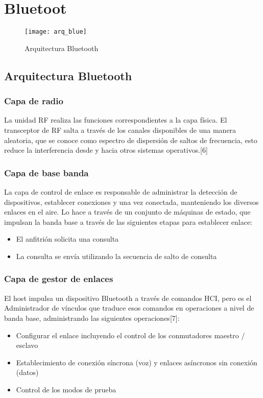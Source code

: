 \chapter{Bluetoot}

\begin{figure}[h]
    \centering
    \texttt{[image: arq\_blue]}
    \caption{Arquitectura Bluetooth}
\end{figure}

\section{Arquitectura Bluetooth}

\subsection{Capa de radio}
La unidad RF realiza las funciones correspondientes a la capa física. El transceptor de RF salta a través de los canales disponibles de una manera aleatoria, que se conoce como espectro de dispersión de saltos de frecuencia, esto reduce la interferencia desde y hacia otros sistemas operativos.[6]

\subsection{Capa de base banda}
La capa de control de enlace es responsable de administrar la detección de dispositivos, establecer conexiones y una vez conectada, manteniendo los diversos enlaces en el aire. Lo hace a través de un conjunto de máquinas de estado, que impulsan la banda base a través de las siguientes etapas para establecer enlace:
\begin{itemize}
    \item El anfitrión solicita una consulta
    \item La consulta se envía utilizando la secuencia de salto de consulta
\end{itemize}

\subsection{Capa de gestor de enlaces}
El host impulsa un dispositivo Bluetooth a través de comandos HCI, pero es el Administrador de vínculos que traduce esos comandos en operaciones a nivel de banda base, administrando las siguientes operaciones[7]:
\begin{itemize}
    \item Configurar el enlace incluyendo el control de los conmutadores maestro / esclavo
    \item Establecimiento de conexión síncrona (voz) y enlaces asíncronos sin conexión (datos)
    \item Control de los modos de prueba
\end{itemize}

